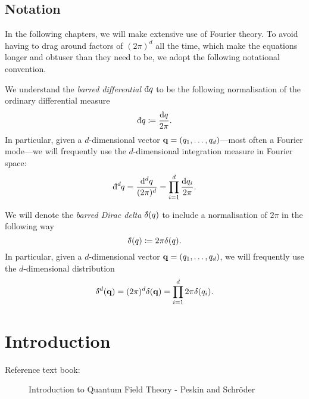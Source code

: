 
\section*{Notation}%
In the following chapters, we will make extensive use of Fourier theory. To avoid having to drag around factors of $(2\pi)^d$ all the time, which make the equations longer and obtuser than they need to be, we adopt the following notational convention.

\begin{notation}
  We understand the \emph{barred differential} $\bdd{q}$ to be the following normalisation of the ordinary differential measure
  \begin{equation}
    \bdd{q} \coloneqq \frac{\dd{q}}{2\pi}.
  \end{equation}
  In particular, given a $d$-dimensional vector $\vb{q} = (q_1, \ldots, q_d)$---most often a Fourier mode---we will frequently use the $d$-dimensional integration measure in Fourier space:
  \begin{equation}
    \bdd[d]{q} = \frac{\dd[d]{q}}{(2\pi)^d} = \prod_{i=1}^d \frac{\dd{q_i}}{2\pi}.
  \end{equation}
\end{notation}

\begin{notation}
  We will denote the \emph{barred Dirac delta} $\bdelta(q)$ to include a normalisation of $2\pi$ in the following way
  \begin{equation}
    \bdelta(q) \coloneqq 2\pi \delta(q).
  \end{equation}
  In particular, given a $d$-dimensional vector $\vb{q} = (q_1, \ldots, q_d)$, we will frequently use the $d$-dimensional distribution
  \begin{equation}
    \bdelta^d(\vb{q}) = (2\pi)^d \delta(\vb{q}) = \prod_{i=1}^d 2\pi \delta(q_i).
  \end{equation}
\end{notation}

\newpage

\chapter{Introduction}%
\label{cha:lecture_1}

\begin{description}
  \item[Reference text book:] Introduction to Quantum Field Theory - Peskin and Schröder
\end{description}

